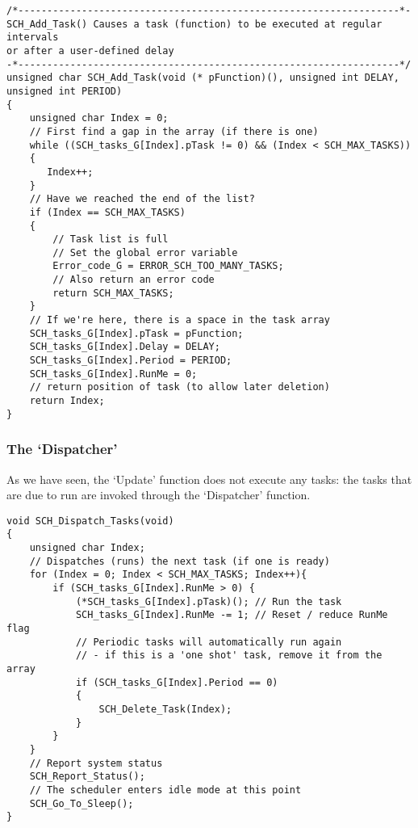 \begin{lstlisting}[basicstyle=\small, caption=An implementation of the scheduler ‘add task’ function]
/*------------------------------------------------------------------*-
SCH_Add_Task() Causes a task (function) to be executed at regular intervals 
or after a user-defined delay
-*------------------------------------------------------------------*/
unsigned char SCH_Add_Task(void (* pFunction)(), unsigned int DELAY, unsigned int PERIOD) 
{
    unsigned char Index = 0;
    // First find a gap in the array (if there is one)
    while ((SCH_tasks_G[Index].pTask != 0) && (Index < SCH_MAX_TASKS))
    {
       Index++;
    } 
    // Have we reached the end of the list? 
    if (Index == SCH_MAX_TASKS)
    {
        // Task list is full
        // Set the global error variable
        Error_code_G = ERROR_SCH_TOO_MANY_TASKS;
        // Also return an error code
        return SCH_MAX_TASKS; 
    }
    // If we're here, there is a space in the task array
    SCH_tasks_G[Index].pTask = pFunction;
    SCH_tasks_G[Index].Delay = DELAY;
    SCH_tasks_G[Index].Period = PERIOD;
    SCH_tasks_G[Index].RunMe = 0;
    // return position of task (to allow later deletion)
    return Index; 
}
\end{lstlisting}


\subsubsection{The ‘Dispatcher’}
As we have seen, the ‘Update’ function does not execute any tasks: the tasks that are
due to run are invoked through the ‘Dispatcher’ function.

\begin{lstlisting}[basicstyle=\small, caption=An implementation of the scheduler ‘dispatch task’ function]
void SCH_Dispatch_Tasks(void) 
{
    unsigned char Index;
    // Dispatches (runs) the next task (if one is ready)
    for (Index = 0; Index < SCH_MAX_TASKS; Index++){
        if (SCH_tasks_G[Index].RunMe > 0) {
            (*SCH_tasks_G[Index].pTask)(); // Run the task
            SCH_tasks_G[Index].RunMe -= 1; // Reset / reduce RunMe flag
            // Periodic tasks will automatically run again
            // - if this is a 'one shot' task, remove it from the array
            if (SCH_tasks_G[Index].Period == 0)
            {
                SCH_Delete_Task(Index);
            }
        } 
    }
    // Report system status
    SCH_Report_Status(); 
    // The scheduler enters idle mode at this point 
    SCH_Go_To_Sleep(); 
}
\end{lstlisting}


